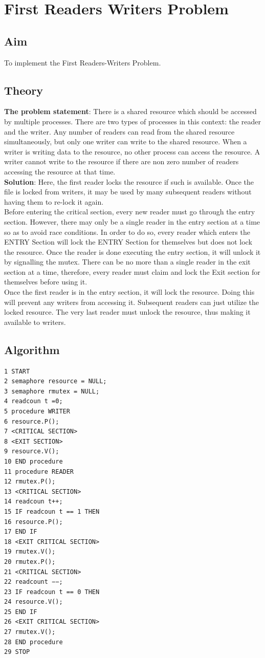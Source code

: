 \section{First Readers Writers Problem}
\subsection{Aim}
To implement the First Readers-Writers Problem.

\subsection{Theory}
\textbf{The problem statement}: There is a shared resource which should be accessed by
multiple processes. There are two types of processes in this context: the reader and
the writer. Any number of readers can read from the shared resource simultaneously,
but only one writer can write to the shared resource. When a writer is writing data
to the resource, no other process can access the resource. A writer cannot write to
the resource if there are non zero number of readers accessing the resource at that
time. \\
\textbf{Solution}: Here, the first reader locks the resource if such is available. Once the file
is locked from writers, it may be used by many subsequent readers without having
them to re-lock it again. \\
Before entering the critical section, every new reader must go through the entry
section. However, there may only be a single reader in the entry section at a time so
as to avoid race conditions. In order to do so, every reader which enters the ENTRY
Section will lock the ENTRY Section for themselves but does not lock the resource.
Once the reader is done executing the entry section, it will unlock it by signalling
the mutex. There can be no more than a single reader in the exit section at a time,
therefore, every reader must claim and lock the Exit section for themselves before
using it. \\
Once the first reader is in the entry section, it will lock the resource. Doing
this will prevent any writers from accessing it. Subsequent readers can just utilize
the locked resource. The very last reader must unlock the resource, thus making it
available to writers.

\subsection{Algorithm}
\begin{verbatim}
1 START
2 semaphore resource = NULL;
3 semaphore rmutex = NULL;
4 readcoun t =0;
5 procedure WRITER
6 resource.P();
7 <CRITICAL SECTION>
8 <EXIT SECTION>
9 resource.V();
10 END procedure
11 procedure READER
12 rmutex.P();
13 <CRITICAL SECTION>
14 readcoun t++;
15 IF readcoun t == 1 THEN
16 resource.P();
17 END IF
18 <EXIT CRITICAL SECTION>
19 rmutex.V();
20 rmutex.P();
21 <CRITICAL SECTION>
22 readcount −−;
23 IF readcoun t == 0 THEN
24 resource.V();
25 END IF
26 <EXIT CRITICAL SECTION>
27 rmutex.V();
28 END procedure
29 STOP
\end{verbatim}

